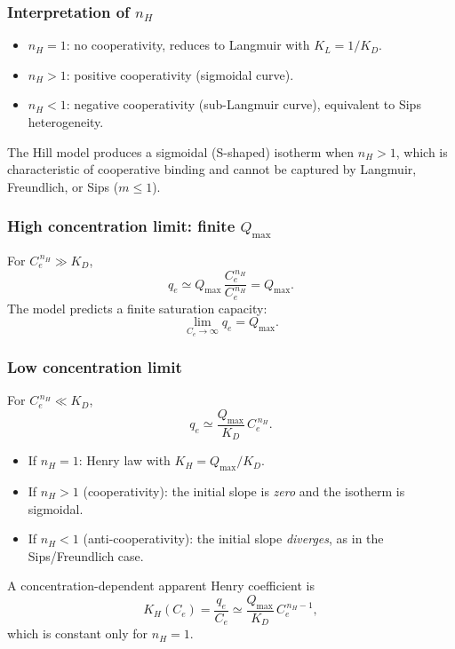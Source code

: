 \documentclass[12pt]{article}
\begin{document}
	\subsubsection{Interpretation of $n_H$}

	\begin{itemize}
		\item $n_H = 1$: no cooperativity, reduces to Langmuir
		with $K_L = 1/K_D$.
		\item $n_H > 1$: positive cooperativity (sigmoidal curve).
		\item $n_H < 1$: negative cooperativity (sub-Langmuir
		curve), equivalent to Sips heterogeneity.
	\end{itemize}
	The Hill model produces a sigmoidal (S-shaped) isotherm when
	$n_H > 1$, which is characteristic of cooperative binding and
	cannot be captured by Langmuir, Freundlich, or Sips ($m \leq 1$).

	\subsubsection{High concentration limit: finite $Q_{\max}$}

	For $C_e^{\,n_H} \gg K_D$,
	\begin{equation}
		q_e \simeq Q_{\max}\,\frac{C_e^{\,n_H}}{C_e^{\,n_H}} = Q_{\max}.
	\end{equation}
	The model predicts a finite saturation capacity:
	\begin{equation}
		\boxed{\lim_{C_e \to \infty} q_e = Q_{\max}.}
	\end{equation}

	\subsubsection{Low concentration limit}

	For $C_e^{\,n_H} \ll K_D$,
	\begin{equation}
		q_e \simeq \frac{Q_{\max}}{K_D}\, C_e^{\,n_H}.
	\end{equation}
	\begin{itemize}
		\item If $n_H = 1$: Henry law with $K_H = Q_{\max}/K_D$.
		\item If $n_H > 1$ (cooperativity): the initial slope is
		\emph{zero} and the isotherm is sigmoidal.
		\item If $n_H < 1$ (anti-cooperativity): the initial slope
		\emph{diverges}, as in the Sips/Freundlich case.
	\end{itemize}
	A concentration-dependent apparent Henry coefficient is
	\begin{equation}
		K_H(C_e)
		= \frac{q_e}{C_e}
		\simeq \frac{Q_{\max}}{K_D}\, C_e^{\,n_H - 1},
	\end{equation}
	which is constant only for $n_H = 1$.
\end{document}

